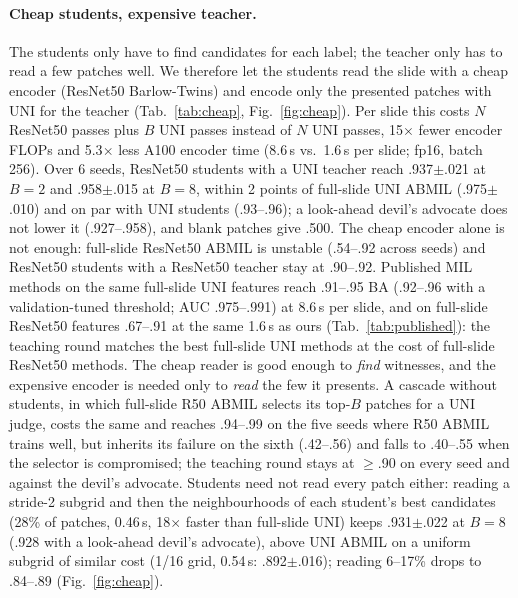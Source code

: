 \documentclass[10pt,twocolumn,letterpaper]{article}
\begin{document}
\paragraph{Cheap students, expensive teacher.} The students only have to find candidates for each label; the teacher only has to read a few patches well. We therefore let the students read the slide with a cheap encoder (ResNet50 Barlow-Twins) and encode only the presented patches with UNI for the teacher (Tab.~\ref{tab:cheap}, Fig.~\ref{fig:cheap}). Per slide this costs $N$ ResNet50 passes plus $B$ UNI passes instead of $N$ UNI passes, 15$\times$ fewer encoder FLOPs and 5.3$\times$ less A100 encoder time (8.6\,s vs.\ 1.6\,s per slide; fp16, batch 256). Over 6 seeds, ResNet50 students with a UNI teacher reach .937$\pm$.021 at $B{=}2$ and .958$\pm$.015 at $B{=}8$, within 2 points of full-slide UNI ABMIL (.975$\pm$.010) and on par with UNI students (.93--.96); a look-ahead devil's advocate does not lower it (.927--.958), and blank patches give .500. The cheap encoder alone is not enough: full-slide ResNet50 ABMIL is unstable (.54--.92 across seeds) and ResNet50 students with a ResNet50 teacher stay at .90--.92. Published MIL methods on the same full-slide UNI features reach .91--.95 BA (.92--.96 with a validation-tuned threshold; AUC .975--.991) at 8.6\,s per slide, and on full-slide ResNet50 features .67--.91 at the same 1.6\,s as ours (Tab.~\ref{tab:published}): the teaching round matches the best full-slide UNI methods at the cost of full-slide ResNet50 methods. The cheap reader is good enough to \emph{find} witnesses, and the expensive encoder is needed only to \emph{read} the few it presents. A cascade without students, in which full-slide R50 ABMIL selects its top-$B$ patches for a UNI judge, costs the same and reaches .94--.99 on the five seeds where R50 ABMIL trains well, but inherits its failure on the sixth (.42--.56) and falls to .40--.55 when the selector is compromised; the teaching round stays at $\ge$.90 on every seed and against the devil's advocate. Students need not read every patch either: reading a stride-2 subgrid and then the neighbourhoods of each student's best candidates (28\% of patches, 0.46\,s, 18$\times$ faster than full-slide UNI) keeps .931$\pm$.022 at $B{=}8$ (.928 with a look-ahead devil's advocate), above UNI ABMIL on a uniform subgrid of similar cost (1/16 grid, 0.54\,s: .892$\pm$.016); reading 6--17\% drops to .84--.89 (Fig.~\ref{fig:cheap}).
\end{document}
